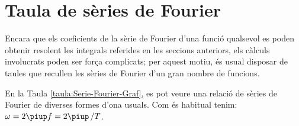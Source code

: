 \section{Taula de s\`{e}ries de Fourier}

Encara que els coeficients de la s\`{e}rie de Fourier d'una funci\'{o} qualsevol es poden
obtenir resolent les integrals referides en les seccions anteriors, els c\`{a}lculs
involucrats poden ser for\c{c}a complicats; per aquest motiu, \'{e}s usual
disposar de taules que recullen les s\`{e}ries de Fourier d'un
gran nombre de funcions.

En la Taula \vref{taula:Serie-Fourier-Graf}, es pot veure una relaci\'{o} de
s\`{e}ries de Fourier de diverses formes d'ona usuals. Com \'{e}s habitual tenim: $\omega=2\piup f = 2\piup\, / T$.

